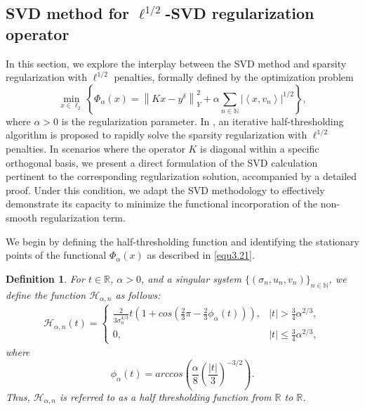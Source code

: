 \documentclass[a4paper,12pt]{article}
\newtheorem{definition}[theorem]{Definition}
\numberwithin{equation}{section}
\begin{document}
\subsection{SVD method for $\ell^{1/2}$-SVD regularization operator}\label{sec3.2}

\par In this section, we explore the interplay between the SVD method and sparsity regularization with $\ell^{1/2}$ penalties, formally defined by the optimization problem
\begin{equation}\label{equ3.21}
    \min_{x\in\ell_{2}}\left\{\Phi_{\alpha}(x)=\left\|Kx-y^{\delta}\right\|_{Y}^{2}+ \alpha\sum_{n\in\mathbb{N}}\left|\left<x,v_{n}\right>\right|^{1/2}\right\},
\end{equation}
where $\alpha>0$ is the regularization parameter. In \cite{XCXZ12}, an iterative half-thresholding algorithm is proposed to rapidly solve the sparsity regularization with $\ell^{1/2}$ penalties. In scenarios where the operator $K$ is diagonal within a specific orthogonal basis, we present a direct formulation of the SVD calculation pertinent to the corresponding regularization solution, accompanied by a detailed proof. Under this condition, we adapt the SVD methodology to effectively demonstrate its capacity to minimize the functional incorporation of the non-smooth regularization term.

\par We begin by defining the half-thresholding function and identifying the stationary points of the functional $\Phi_{\alpha}\left(x\right)$ as described in \eqref{equ3.21}.

\begin{definition}\label{def3.10}
    For $t\in\mathbb{R}$, $\alpha>0$, and a singular system $\{(\sigma_{n},u_{n},v_{n})\}_{n\in\mathbb{N}}$, we define the function $\mathcal{H}_{\alpha,n}$ as follows:
    \begin{align}\label{equ3.22}
        \mathcal{H}_{\alpha,n}(t)=
        \left\{             
        \begin{array}{ll}
            \frac{2}{3\sigma_{n}^{4/3}}t\left(1+cos\left(\frac{2}{3}\pi-\frac{2}{3}\phi_{\alpha}(t)\right)\right), & |t| > \frac{3}{4}\alpha^{2/3}, \\
            0, & |t| \leq \frac{3}{4}\alpha^{2/3},
        \end{array}
        \right.
    \end{align}
    where
    \begin{equation*}
        \phi_{\alpha}(t)=arccos\left(\frac{\alpha}{8}\left(\frac{|t|}{3}\right)^{-3/2}\right).
    \end{equation*}
    Thus, $\mathcal{H}_{\alpha,n}$ is referred to as a half thresholding function from $\mathbb{R}$ to $\mathbb{R}$.
\end{definition}
\end{document}
